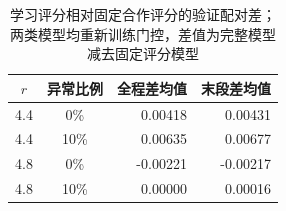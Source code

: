 \begin{table}[!htbp]
\centering\small
\caption{学习评分相对固定合作评分的验证配对差；两类模型均重新训练门控，差值为完整模型减去固定评分模型}
\label{tab:w2-score-ablation}
\begin{tabular}{ccrr}
\toprule
$r$ & 异常比例 & 全程差均值 & 末段差均值 \\
\midrule
4.4 & 0\% & 0.00418 & 0.00431 \\
4.4 & 10\% & 0.00635 & 0.00677 \\
4.8 & 0\% & -0.00221 & -0.00217 \\
4.8 & 10\% & 0.00000 & 0.00016 \\
\bottomrule
\end{tabular}
\par{}
\end{table}
